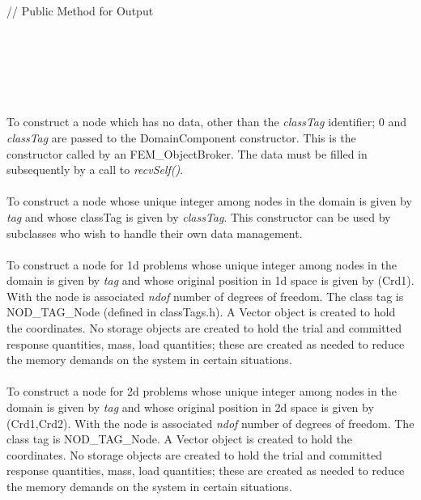 \indent{}\\ \\
\indent\indent // Public Method for Output \\
\indent{} \\
\indent{} \\ 
\indent{} \\
\indent{} \\



  \\
  \\
To construct a node which has no data, other than the {\em classTag}
identifier; $0$ and {\em classTag} are passed to the DomainComponent
constructor. This is the constructor called by an
FEM\_ObjectBroker. The data must be filled in subsequently by a call
to {\em recvSelf()}. \\ 

  \\
To construct a node whose unique integer among nodes in the
domain is given by {\em tag} and whose classTag is given by {\em
classTag}. This constructor can be used by 
subclasses who wish to handle their own data management. \\ 

  \\
To construct a node for 1d problems whose unique integer among nodes in the
domain is given by {\em tag} and whose original position in 1d space
is given by (Crd1). With the node is associated {\em ndof} number
of degrees of freedom. The class tag is NOD\_TAG\_Node (defined in
classTags.h). A Vector object is created to hold the coordinates. No
storage objects are created to hold the trial and committed response
quantities, mass, load quantities; these are created as needed to
reduce the memory demands on the system in certain situations. \\ 

  \\
To construct a node for 2d problems whose unique integer among nodes in the
domain is given by {\em tag} and whose original position in 2d space
is given by (Crd1,Crd2). With the node is associated {\em ndof} number
of degrees of freedom. The class tag is NOD\_TAG\_Node. A Vector object
is created to hold the coordinates. No
storage objects are created to hold the trial and committed response
quantities, mass, load quantities; these are created as needed to
reduce the memory demands on the system in certain situations. \\ 


